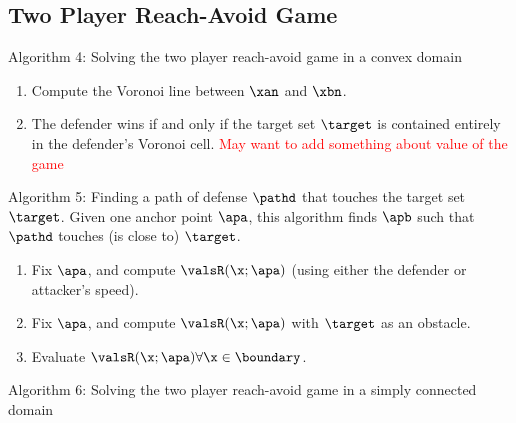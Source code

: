 \subsection{Two Player Reach-Avoid Game}
Algorithm 4: Solving the two player reach-avoid game in a convex domain
\begin{enumerate}
\item Compute the Voronoi line between $\xan$ and $\xbn$.
\item The defender wins if and only if the target set $\target$ is contained entirely in the defender's Voronoi cell.
\textcolor{red}{May want to add something about value of the game}
\end{enumerate}

Algorithm 5: Finding a path of defense $\pathd$ that touches the target set $\target$.
Given one anchor point $\apa$, this algorithm finds $\apb$ such that $\pathd$ touches (is close to) $\target$.
\begin{enumerate}
\item Fix $\apa$, and compute $
\valsR(\x;\apa)$ (using either the defender or attacker's speed).
\item Fix $\apa$, and compute $\valsR(\x;\apa)$ with $\target$ as an obstacle.
\item Evaluate $\valsR(\x;\apa) \forall \x\in\boundary$. 
\end{enumerate}

Algorithm 6: Solving the two player reach-avoid game in a simply connected domain